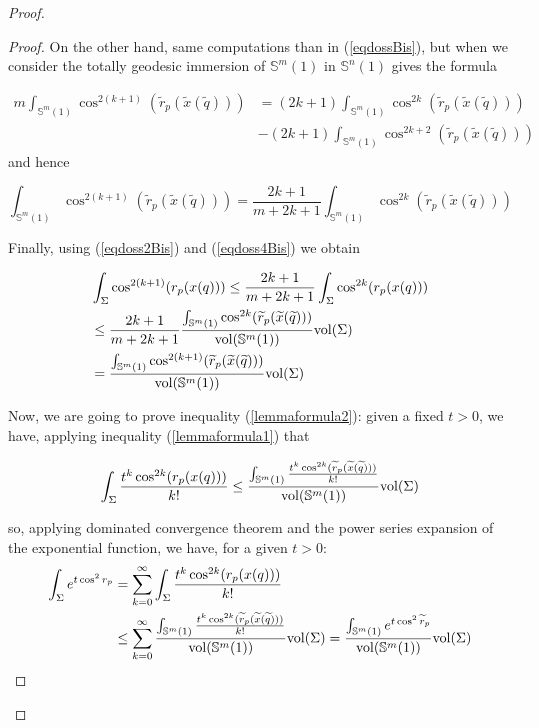 \documentclass{amsart}
\theoremstyle{definition}
\theoremstyle{remark}
\newcommand{\ese}{\mathbb{S}}
\begin{document}
\begin{proof}
\begin{proof}
On the other hand, same computations than in (\ref{eqdossBis}), but when we consider the totally geodesic immersion of $\ese^m(1)$ in $\ese^n(1)$ gives the formula

\begin{equation}\label{eqdoss3Bis}
\begin{aligned}
m\int_{\ese^m(1)} \cos^{2(k+1)}(\widetilde{r}_p(\widetilde{x}(\widetilde{q})))&=(2k+1)\int_{\ese^m(1)}\cos^{2k}(\widetilde{r}_p(\widetilde{x}(\widetilde{q})))\\&-(2k+1)\int_{\ese^m(1)} \cos^{2k+2}(\widetilde{r}_p(\widetilde{x}(\widetilde{q})))
\end{aligned}
\end{equation}
\noindent and hence

\begin{equation}\label{eqdoss4Bis}
\int_{\ese^m(1)} \cos^{2(k+1)}(\widetilde{r}_p(\widetilde{x}(\widetilde{q})))=\frac{2k+1}{m+2k+1}\int_{\ese^m(1)}\cos^{2k}(\widetilde{r}_p(\widetilde{x}(\widetilde{q})))
\end{equation}

Finally, using (\ref{eqdoss2Bis}) and (\ref{eqdoss4Bis}) we obtain


\begin{equation}\label{eqdoss5Bis}
\begin{aligned}
&\int_\Sigma \cos^{2(k+1)}(r_p(x(q)))\leq \frac{2k+1}{m+2k+1}\int_\Sigma \cos^{2k}(r_p(x(q)))\\ & \leq  \frac{2k+1}{m+2k+1}\frac{\int_{\mathbb{S}^m(1)} \cos^{2k}(\widetilde{r}_p(\widetilde{x}(\widetilde{q})))}{{\rm vol}(\mathbb{S}^m(1))} {\rm vol}(\Sigma)\\&=\frac{\int_{\mathbb{S}^m(1)} \cos^{2(k+1)}(\widetilde{r}_p(\widetilde{x}(\widetilde{q})))}{{\rm vol}(\mathbb{S}^m(1))} {\rm vol}(\Sigma)
\end{aligned}
\end{equation}

\medskip

Now, we are going to prove inequality (\ref{lemmaformula2}): given a fixed $t>0$, we have, applying inequality (\ref{lemmaformula1}) that

$$\int_\Sigma\frac{t^k \cos^{2k}(r_p(x(q)))}{k!} \leq \frac{\int_{\mathbb{S}^m(1)}\frac{t^k \cos^{2k}(\widetilde{r}_p(\widetilde{x}(\widetilde{q})))}{k!}}{{\rm vol}(\mathbb{S}^m(1))} {\rm vol}(\Sigma)$$

\noindent so, applying dominated convergence theorem and the power series expansion of the exponential function, we have, for a given $t>0$:
$$
\begin{aligned}
\int_{\Sigma} e^{t \cos^2r_p} &=\sum_{k=0}^\infty \int_\Sigma\frac{t^k \cos^{2k}(r_p(x(q)))}{k!} \\&\leq 
\sum_{k=0}^\infty \frac{\int_{\mathbb{S}^m(1)}\frac{t^k \cos^{2k}(\widetilde{r}_p(\widetilde{x}(\widetilde{q})))}{k!}}{{\rm vol}(\mathbb{S}^m(1))} {\rm vol}(\Sigma)=\frac{\int_{\ese^m(1)} e^{t \cos^2\widetilde{r}_p}}{{\rm vol}(\mathbb{S}^m(1))} {\rm vol}(\Sigma)
\end{aligned}
$$


\end{proof}
\end{proof}
\end{document}
